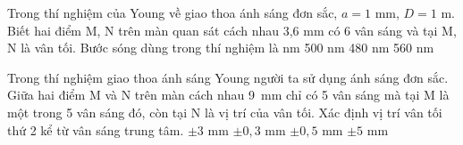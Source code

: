 \begin{vidu}%
Trong thí nghiệm của Young về giao thoa ánh sáng đơn sắc, $a = 1 $ mm, $D =1 $ m. Biết hai điểm M, N trên màn quan sát cách nhau 3,6 mm có 6 vân sáng và tại M, N là vân tối. Bước sóng dùng trong thí nghiệm là
\choice
{ nm}
{500 nm}
{480 nm}
{560 nm}
\end{vidu} %
\begin{vidu}%
Trong thí nghiệm giao thoa ánh sáng Young người ta sử dụng ánh sáng đơn sắc. Giữa hai điểm M và N trên màn cách nhau 9\ mm chỉ có 5 vân sáng mà tại M là một trong 5 vân sáng đó, còn tại N là vị trí của vân tối. Xác định vị trí vân tối thứ 2 kể từ vân sáng trung tâm.
\choice
{\True $ \pm 3$ mm}
{$ \pm 0,3$ mm}
{$ \pm 0,5$ mm}
{$ \pm 5$ mm}
\end{vidu} %

